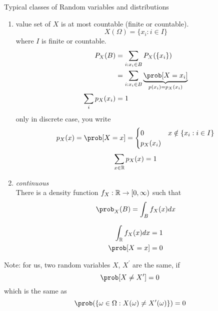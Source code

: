 \documentclass[mfit.tex]{subfiles}
\begin{document}
Typical classes of Random variables and distributions
\begin{enumerate}
  \item value set of $X$ is at most countable (finite or countable).
  \[ X(\Omega) = \{ x_i: i \in I\}\]
  where $I$ is finite or countable.
  \begin{align*}
    P_X(B) &= \sum_{i: x_i \in B} P_X(\{ x_i \}) \\
    &= \sum_{i: x_i \in B} \underbrace{\prob[X = x_i]}_{p(x_i) = p_X(x_i)} \\
    \sum_{i} p_X(x_i) &= 1
  \end{align*}
  only in discrete case, you write
  \begin{align*}
    p_X(x) = \prob[X = x] = \begin{cases} 0 & x \notin \{x_i: i \in I\} \\ p_X(x_i) \end{cases}
  \end{align*}
  \begin{align*}
    \sum_{x \in \mathbb{R}} p_X(x) = 1
  \end{align*}
  \item \emph{continuous}\\
  There is a density function $f_X: \mathbb{R} \to [0,\infty)$ such that
  \begin{align*}
    \prob_X(B) = \int_B f_X(x) dx
  \end{align*}
  
  \begin{align*}
    \int_\R f_X(x) dx &= 1 \\
    \prob[X = x] &= 0
  \end{align*}
\end{enumerate}

Note: for us, two random variables $X$, $X^\prime$ are the same, if
\[ \prob[X \neq X^\prime] = 0 \]
which is the same as
\[ \prob(\{ \omega \in \Omega: X(\omega) \neq X^\prime(\omega) \} ) = 0 \]

\end{document}
